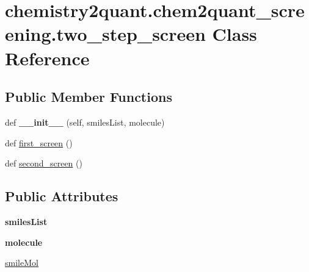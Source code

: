 \hypertarget{classchemistry2quant_1_1chem2quant__screening_1_1two__step__screen}{}\section{chemistry2quant.\+chem2quant\+\_\+screening.\+two\+\_\+step\+\_\+screen Class Reference}
\label{classchemistry2quant_1_1chem2quant__screening_1_1two__step__screen}
\subsection*{Public Member Functions}
\begin{DoxyCompactItemize}
\item 
\mbox{\label{classchemistry2quant_1_1chem2quant__screening_1_1two__step__screen_a668b8e0a34e77ed7a99ebfa840f5a671}} 
def {\bfseries \+\_\+\+\_\+init\+\_\+\+\_\+} (self, smiles\+List, molecule)
\item 
def \hyperlink{classchemistry2quant_1_1chem2quant__screening_1_1two__step__screen_a7055bbeb08bf745c49037a705b01ed71}{first\+\_\+screen} ()
\item 
def \hyperlink{classchemistry2quant_1_1chem2quant__screening_1_1two__step__screen_a06a642274b788b8c411020438f82d04f}{second\+\_\+screen} ()
\end{DoxyCompactItemize}
\subsection*{Public Attributes}
\begin{DoxyCompactItemize}
\item 
\mbox{\label{classchemistry2quant_1_1chem2quant__screening_1_1two__step__screen_ac68faf6910ed2387e69bb411b58fb270}} 
{\bfseries smiles\+List}
\item 
\mbox{\label{classchemistry2quant_1_1chem2quant__screening_1_1two__step__screen_a95ae6f8e785064baa9a1f896c5fa7ce4}} 
{\bfseries molecule}
\item 
\hyperlink{classchemistry2quant_1_1chem2quant__screening_1_1two__step__screen_a6fde4c5a06a5d83ff1bad48186131072}{smile\+Mol}
\end{DoxyCompactItemize}


